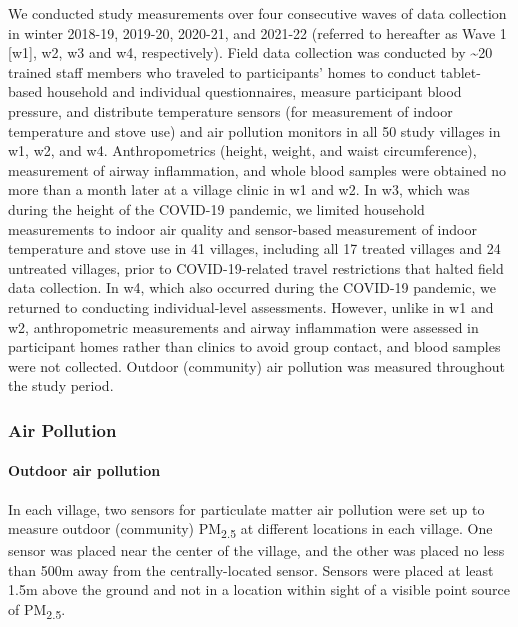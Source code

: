 \documentclass[
  letterpaper,
  DIV=11,
  numbers=noendperiod]{scrartcl}
\let\oldparagraph\paragraph
\renewcommand{\paragraph}[1]{\oldparagraph{#1}\mbox{}}
\begin{document}
We conducted study measurements over four consecutive waves of data
collection in winter 2018-19, 2019-20, 2020-21, and 2021-22 (referred to
hereafter as Wave 1 {[}w1{]}, w2, w3 and w4, respectively). Field data
collection was conducted by \textasciitilde20 trained staff members who
traveled to participants' homes to conduct tablet-based household and
individual questionnaires, measure participant blood pressure, and
distribute temperature sensors (for measurement of indoor temperature
and stove use) and air pollution monitors in all 50 study villages in
w1, w2, and w4. Anthropometrics (height, weight, and waist
circumference), measurement of airway inflammation, and whole blood
samples were obtained no more than a month later at a village clinic in
w1 and w2. In w3, which was during the height of the COVID-19 pandemic,
we limited household measurements to indoor air quality and sensor-based
measurement of indoor temperature and stove use in 41 villages,
including all 17 treated villages and 24 untreated villages, prior to
COVID-19-related travel restrictions that halted field data collection.
In w4, which also occurred during the COVID-19 pandemic, we returned to
conducting individual-level assessments. However, unlike in w1 and w2,
anthropometric measurements and airway inflammation were assessed in
participant homes rather than clinics to avoid group contact, and blood
samples were not collected. Outdoor (community) air pollution was
measured throughout the study period.

\subsubsection{Air Pollution}\label{air-pollution}

\paragraph{Outdoor air pollution}\label{outdoor-air-pollution}

In each village, two sensors for particulate matter air pollution were
set up to measure outdoor (community) PM\textsubscript{2.5} at different
locations in each village. One sensor was placed near the center of the
village, and the other was placed no less than 500m away from the
centrally-located sensor. Sensors were placed at least 1.5m above the
ground and not in a location within sight of a visible point source of
PM\textsubscript{2.5}.
\end{document}
